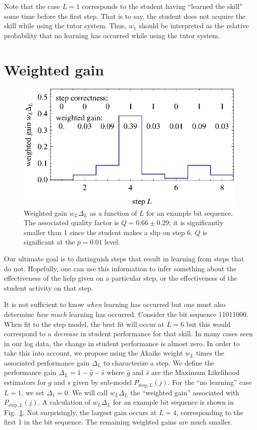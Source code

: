 \documentclass{edm_template}
\begin{document}
Note that the case $L=1$ corresponds to the student having 
``learned the skill'' some time before the first step.  That is to say, 
the student does not acquire the skill while using the tutor system.
Thus, $w_1$ should be interpreted as the relative probability
that no learning has occurred while using the tutor system.

\section{Weighted gain}

\begin{figure}
  \centering \includegraphics{weighted-gains.eps}
   \caption{Weighted gain $w_L\Delta_L$ as a function of $L$ for an example bit sequence.
    The associated quality factor is $Q=0.66\pm0.29$;  it is
     significantly smaller than 1 since the student makes
     a slip on step 6.  $Q$ is significant at the $p=0.01$ level.}
    \label{weighted-gain-example}
\end{figure}

Our ultimate goal is to distinguish steps that result in 
learning from steps that do not.  Hopefully, one can use this
information to infer something about the effectiveness of the help
given on a particular step, or the effectiveness of
the student activity on that step.

It is not sufficient to know {\it when} learning has occurred but one
must also determine {\it how much} learning has occurred.  Consider
the bit sequence 11011000.  When fit to the step model, the best fit
will occur at $L=6$ but this would correspond to a {\it decrease} in student
performance for that skill.  In many cases seen in our log data, 
the change in student performance is almost zero.  In order to take 
this into account,
we propose using the Akaike weight $w_L$ times the associated performance
gain $\Delta_L$ to characterize a step.  We define the performance gain
$\Delta_L=1-\hat{g}-\hat{s}$ where $\hat{g}$ and $\hat{s}$ are the
Maximum Likelihood estimators for $g$ and $s$ given by sub-model
$P_{\mathrm{step},L}(j)$.  For the ``no learning'' case $L=1$, we set
$\Delta_1=0$.  We will call $w_L \Delta_L$ the ``weighted gain''
associated with $P_{\mathrm{step},L}(j)$.
A calculation of $w_L \Delta_L$  for an example bit sequence is
shown in Fig.~\ref{weighted-gain-example}.  Not surprisingly, 
the largest gain occurs at $L=4$, corresponding to the first 1 in the
bit sequence.  The remaining weighted gains are much smaller.
\end{document}
